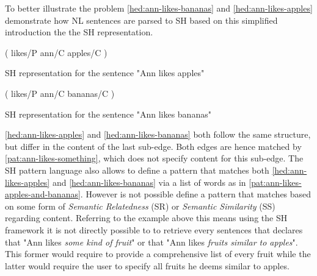 \documentclass[11pt]{scrreprt}
\let\cite\parencite  %
\begin{document}


To better illustrate the problem \cref{hed:ann-likes-bananas} and \cref{hed:ann-likes-apples} demonstrate how NL sentences are parsed to SH based on this simplified introduction the the SH representation.

\begin{hedge}
  \normalfont\sffamily
  \centering
  ( likes/P ann/C apples/C ) 
  \caption{SH representation for the sentence "Ann likes apples"}
  \label{hed:ann-likes-apples}
\end{hedge}

\begin{hedge}
  \normalfont\sffamily
  \centering
  ( likes/P ann/C bananas/C ) 
  \caption{SH representation for the sentence "Ann likes bananas"}
  \label{hed:ann-likes-bananas}
\end{hedge}

\cref{hed:ann-likes-apples} and \cref{hed:ann-likes-bananas} both follow the same structure, but differ in the content of the last sub-edge. Both edges are hence matched by \cref{pat:ann-likes-something}, which does not specify content for this sub-edge.
The SH pattern language also allows to define a pattern that matches both \cref{hed:ann-likes-apples} and \cref{hed:ann-likes-bananas} via a list of words as in \cref{pat:ann-likes-apples-and-bananas}. However is not possible define a pattern that matches based on some form of \textit{Semantic Relatedness} (SR) or \textit{Semantic Similarity} (SS) \cite{harispeSemanticSimilarityNatural2015} regarding content.
Referring to the example above this means using the SH framework it is not directly possible to to retrieve every sentences that declares that "Ann likes \textit{some kind of fruit}" or that "Ann likes \textit{fruits similar to apples}". This former would require to provide a comprehensive list of every fruit while the latter would require the user to specify all fruits he deems similar to apples.
\end{document}
